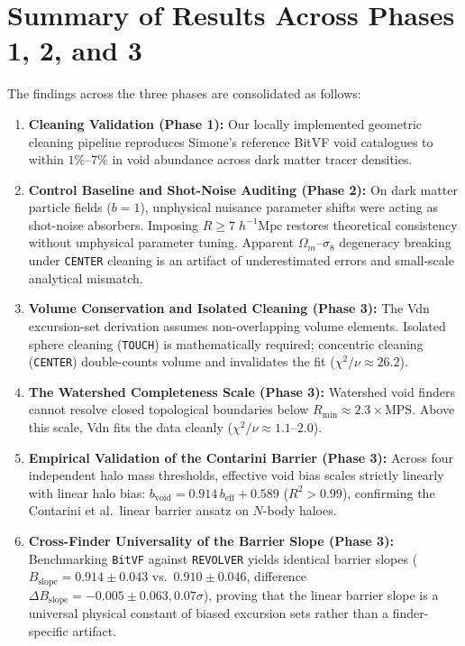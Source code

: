 \documentclass[12pt]{report}
\begin{document}
\section{Summary of Results Across Phases 1, 2, and 3}

The findings across the three phases are consolidated as follows:
\begin{enumerate}
    \item \textbf{Cleaning Validation (Phase 1):} Our locally implemented geometric cleaning pipeline reproduces Simone's reference BitVF void catalogues to within $1\%$--$7\%$ in void abundance across dark matter tracer densities.
    \item \textbf{Control Baseline and Shot-Noise Auditing (Phase 2):} On dark matter particle fields ($b=1$), unphysical nuisance parameter shifts were acting as shot-noise absorbers. Imposing $R \ge 7\;h^{-1}\mathrm{Mpc}$ restores theoretical consistency without unphysical parameter tuning. Apparent $\Omega_m$--$\sigma_8$ degeneracy breaking under \texttt{CENTER} cleaning is an artifact of underestimated errors and small-scale analytical mismatch.
    \item \textbf{Volume Conservation and Isolated Cleaning (Phase 3):} The Vdn excursion-set derivation assumes non-overlapping volume elements. Isolated sphere cleaning (\texttt{TOUCH}) is mathematically required; concentric cleaning (\texttt{CENTER}) double-counts volume and invalidates the fit ($\chi^2/\nu \approx 26.2$).
    \item \textbf{The Watershed Completeness Scale (Phase 3):} Watershed void finders cannot resolve closed topological boundaries below $R_{\mathrm{min}} \approx 2.3 \times \mathrm{MPS}$. Above this scale, Vdn fits the data cleanly ($\chi^2/\nu \approx 1.1$--$2.0$).
    \item \textbf{Empirical Validation of the Contarini Barrier (Phase 3):} Across four independent halo mass thresholds, effective void bias scales strictly linearly with linear halo bias: $b_{\mathrm{void}} = 0.914\,b_{\mathrm{eff}} + 0.589$ ($R^2 > 0.99$), confirming the Contarini et al.\ linear barrier ansatz on $N$-body haloes.
    \item \textbf{Cross-Finder Universality of the Barrier Slope (Phase 3):} Benchmarking \texttt{BitVF} against \texttt{REVOLVER} yields identical barrier slopes ($B_{\mathrm{slope}} = 0.914 \pm 0.043$ vs.\ $0.910 \pm 0.046$, difference $\Delta B_{\mathrm{slope}} = -0.005 \pm 0.063, 0.07\sigma$), proving that the linear barrier slope is a universal physical constant of biased excursion sets rather than a finder-specific artifact.

\end{enumerate}
\end{document}
